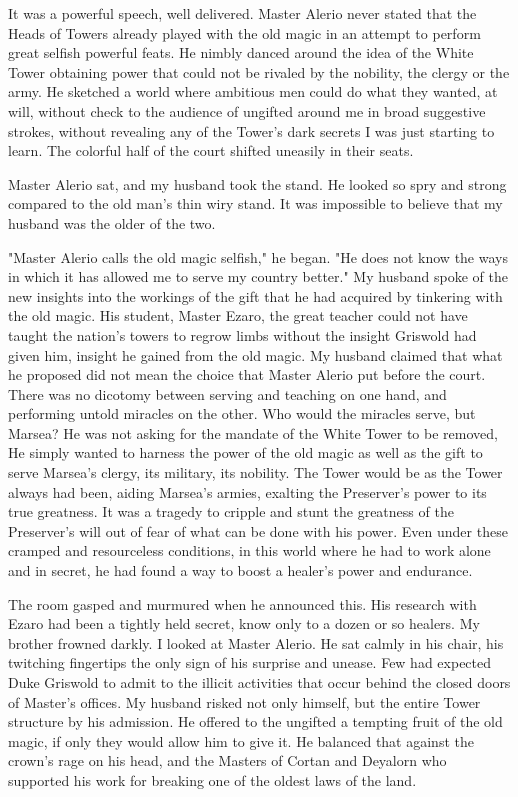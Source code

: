 \documentclass{article}
\begin{document}
It was a powerful speech, well delivered. Master Alerio never stated that the Heads of Towers already played with the old magic in an attempt to perform great selfish powerful feats. He nimbly danced around the idea of the White Tower obtaining power that could not be rivaled by the nobility, the clergy or the army. He sketched a world where ambitious men could do what they wanted, at will, without check to the audience of ungifted around me in broad suggestive strokes, without revealing any of the Tower's dark secrets I was just starting to learn. The colorful half of the court shifted uneasily in their seats. 

Master Alerio sat, and my husband took the stand. He looked so spry and strong compared to the old man's thin wiry stand. It was impossible to believe that my husband was the older of the two. 

"Master Alerio calls the old magic selfish," he began. "He does not know the ways in which it has allowed me to serve my country better." My husband spoke of the new insights into the workings of the gift that he had acquired by tinkering with the old magic. His student, Master Ezaro, the great teacher could not have taught the nation's towers to regrow limbs without the insight Griswold had given him, insight he gained from the old magic. My husband claimed that what he proposed did not mean the choice that Master Alerio put before the court. There was no dicotomy between serving and teaching on one hand, and performing untold miracles on the other. Who would the miracles serve, but Marsea? He was not asking for the mandate of the White Tower to be removed, He simply wanted to harness the power of the old magic as well as the gift to serve Marsea's clergy, its military, its nobility. The Tower would be as the Tower always had been, aiding Marsea's armies, exalting the Preserver's power to its true greatness. It was a tragedy to cripple and stunt the greatness of the Preserver's will out of fear of what can be done with his power. Even under these cramped and resourceless conditions, in this world where he had to work alone and in secret,  he had found a way to boost a healer's power and endurance. 

The room gasped and murmured when he announced this. His research with Ezaro had been a tightly held secret, know only to a dozen or so healers. My brother frowned darkly. I looked at Master Alerio. He sat calmly in his chair, his twitching fingertips the only sign of his surprise and unease. Few had expected Duke Griswold to admit to the illicit activities that occur behind the closed doors of Master's offices. My husband risked not only himself, but the entire Tower structure by his admission. He offered to the ungifted a tempting fruit of the old magic, if only they would allow him to give it. He balanced that against the crown's rage on his head, and the Masters of Cortan and Deyalorn who supported his work for breaking one of the oldest laws of the land.
\end{document}
